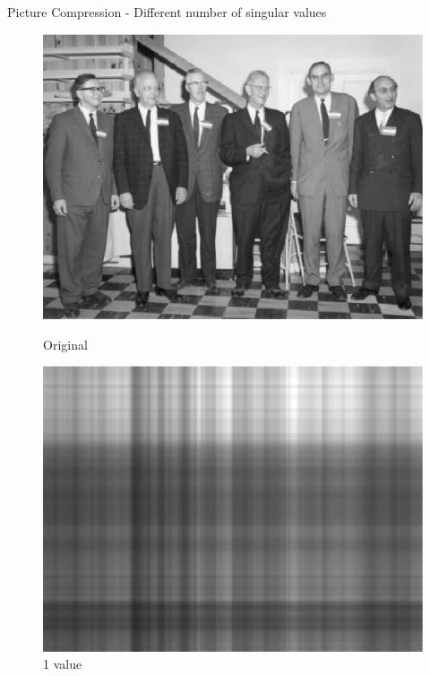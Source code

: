 \documentclass[10pt,a4paper]{beamer}
\begin{document}
\begin{frame}{Picture Compression - Different number of singular values} 
	\begin{figure}
		\begin{minipage}{0.24\linewidth}
			\includegraphics[width=1\linewidth]{SVD/Image.originale.eps}
				\caption{Original}
		\end{minipage}
		\begin{minipage}{0.24\linewidth}
			\includegraphics[width=1\linewidth]{SVD/SVD.Tronquee.1.eps}
				\caption{1 value}
		\end{minipage}
		\begin{minipage}{0.24\linewidth}

\end{minipage}
\end{figure}
\end{frame}
\end{document}
